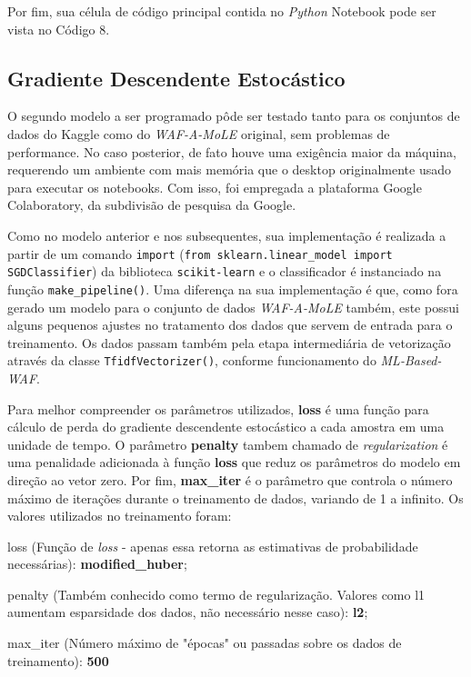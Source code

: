 Por fim, sua célula de código principal contida no \textit{Python} Notebook pode ser vista no Código 8.

\label{sec:codigos:modelos}
\bigskip

\subsection{Gradiente Descendente Estocástico}
O segundo modelo a ser programado pôde ser testado tanto para os conjuntos de dados do Kaggle como do \textit{WAF-A-MoLE} original, sem problemas de performance. No caso posterior, de fato houve uma exigência maior da máquina, requerendo um ambiente com mais memória que o desktop originalmente usado para executar os notebooks. Com isso, foi empregada a plataforma Google Colaboratory, da subdivisão de pesquisa da Google. 

Como no modelo anterior e nos subsequentes, sua implementação é realizada a partir de um comando \verb+import+ (\verb+from sklearn.linear_model import SGDClassifier+) da biblioteca \verb+scikit-learn+ e o classificador é instanciado na função \verb+make_pipeline()+. Uma diferença na sua implementação é que, como fora gerado um modelo para o conjunto de dados \textit{WAF-A-MoLE} também, este possui alguns pequenos ajustes no tratamento dos dados que servem de entrada para o treinamento. Os dados passam também pela etapa intermediária de vetorização através da classe \verb+TfidfVectorizer()+, conforme funcionamento do \textit{ML-Based-WAF}. 

Para melhor compreender os parâmetros utilizados, \textbf{loss} é uma função para cálculo de perda do gradiente descendente estocástico a cada amostra em uma unidade de tempo. O parâmetro \textbf{penalty} tambem chamado de \textit{regularization} é uma penalidade adicionada à função \textbf{loss} que reduz os parâmetros do modelo em direção ao vetor zero. Por fim, \textbf{max\_iter} é o parâmetro que controla o número máximo de iterações durante o treinamento de dados, variando de 1 a infinito. Os valores utilizados no treinamento foram:
\begin{alineas}
    \item loss (Função de \textit{loss} - apenas essa retorna as estimativas de probabilidade necessárias): \textbf{modified\_huber};
    \item penalty (Também conhecido como termo de regularização. Valores como l1 aumentam esparsidade dos dados, não necessário nesse caso): \textbf{l2};
    \item max\_iter (Número máximo de "épocas" ou passadas sobre os dados de treinamento): \textbf{500}
\end{alineas}


